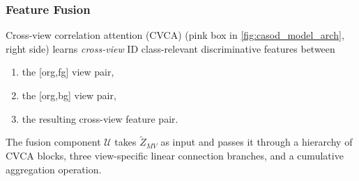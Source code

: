 \subsubsection{Feature Fusion}
Cross-view correlation attention (CVCA) (pink box in \ref{fig:casod_model_arch}, right side) learns \emph{cross-view} ID class-relevant discriminative features between
\begin{enumerate}
    \item the [org,fg] view pair,
    \item the [org,bg] view pair,
    \item the resulting cross-view feature pair.
\end{enumerate}
The fusion component $\mathcal{U}$ takes $\tilde{Z}_{MV}$ as input and passes it through a hierarchy of CVCA blocks, three view-specific linear connection branches, and a cumulative aggregation operation.

